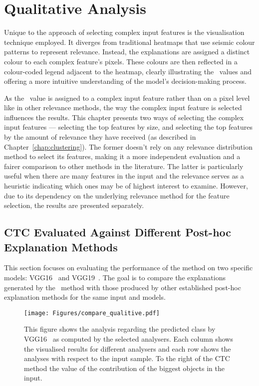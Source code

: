 \section{Qualitative Analysis}

Unique to the approach of selecting complex input features is the visualisation technique employed. It diverges from traditional heatmaps that use seismic colour patterns to represent relevance. Instead, the explanations are assigned a distinct colour to each complex feature's pixels. These colours are then reflected in a colour-coded legend adjacent to the heatmap, clearly illustrating the \CTC\ values and offering a more intuitive understanding of the model's decision-making process.

As the \CTC\ value is assigned to a complex input feature rather than on a pixel level like in other relevance methods, the way the complex input feature is selected influences the results. This chapter presents two ways of selecting the complex input features --- selecting the top features by size, and selecting the top features by the amount of relevance they have received (as described in Chapter~\ref{chap:clustering}). The former doesn't rely on any relevance distribution method to select its features, making it a more independent evaluation and a fairer comparison to other methods in the literature. The latter is particularly useful when there are many features in the input and the relevance serves as a heuristic indicating which ones may be of highest interest to examine. However, due to its dependency on the underlying relevance method for the feature selection, the results are presented separately.  

\subsection{CTC Evaluated Against Different Post-hoc Explanation Methods}

This section focuses on evaluating the performance of the \CTC method on two specific models: VGG16~\cite{SimonyanZ14a} and VGG19~\cite{SimonyanZ14a}. The goal is to compare the explanations generated by the \CTC\ method with those produced by other established post-hoc explanation methods for the same input and models.

\begin{figure}[ht!]
	\begin{center}
		\texttt{[image: Figures/compare\_qualitive.pdf]}
	\end{center}
	\caption{This figure shows the analysis regarding the predicted class by VGG16~\cite{SimonyanZ14a} as computed by the selected analysers. Each column shows the visualised results for different analysers and each row shows the analyses with respect to the input sample. To the right of the CTC method the value of the contribution of the biggest objects in the input.}
	\label{Fig:quality}
\end{figure} 

